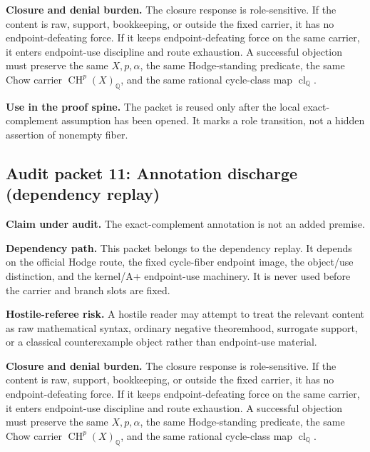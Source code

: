 \documentclass[11pt]{article}
\newcommand{\QQ}{\mathbb{Q}}
\newcommand{\CH}{\operatorname{CH}}
\newcommand{\clQ}{\operatorname{cl}_{\QQ}}
\begin{document}
\par\noindent\textbf{Closure and denial burden.} The closure response is role-sensitive. If the content is raw, support, bookkeeping, or outside the fixed carrier, it has no endpoint-defeating force. If it keeps endpoint-defeating force on the same carrier, it enters endpoint-use discipline and route exhaustion. A successful objection must preserve the same $X,p,\alpha$, the same Hodge-standing predicate, the same Chow carrier $\CH^p(X)_\QQ$, and the same rational cycle-class map $\clQ$.


\par\noindent\textbf{Use in the proof spine.} The packet is reused only after the local exact-complement assumption has been opened. It marks a role transition, not a hidden assertion of nonempty fiber.


\subsection{Audit packet 11: Annotation discharge (dependency replay)}


\par\noindent\textbf{Claim under audit.} The exact-complement annotation is not an added premise.


\par\noindent\textbf{Dependency path.} This packet belongs to the dependency replay. It depends on the official Hodge route, the fixed cycle-fiber endpoint image, the object/use distinction, and the kernel/A+ endpoint-use machinery. It is never used before the carrier and branch slots are fixed.


\par\noindent\textbf{Hostile-referee risk.} A hostile reader may attempt to treat the relevant content as raw mathematical syntax, ordinary negative theoremhood, surrogate support, or a classical counterexample object rather than endpoint-use material.


\par\noindent\textbf{Closure and denial burden.} The closure response is role-sensitive. If the content is raw, support, bookkeeping, or outside the fixed carrier, it has no endpoint-defeating force. If it keeps endpoint-defeating force on the same carrier, it enters endpoint-use discipline and route exhaustion. A successful objection must preserve the same $X,p,\alpha$, the same Hodge-standing predicate, the same Chow carrier $\CH^p(X)_\QQ$, and the same rational cycle-class map $\clQ$.
\end{document}
